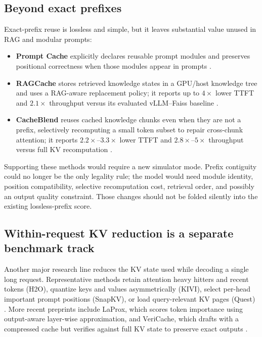 \documentclass[11pt]{article}
\begin{document}
\subsection{Beyond exact prefixes}

Exact-prefix reuse is lossless and simple, but it leaves substantial value unused in
RAG and modular prompts:

\begin{itemize}
  \item \textbf{Prompt Cache} explicitly declares reusable prompt modules and preserves
  positional correctness when those modules appear in prompts \cite{promptcache}.
  \item \textbf{RAGCache} stores retrieved knowledge states in a GPU/host knowledge tree
  and uses a RAG-aware replacement policy; it reports up to \(4\times\) lower TTFT and
  \(2.1\times\) throughput versus its evaluated vLLM--Faiss baseline
  \cite{ragcache}.
  \item \textbf{CacheBlend} reuses cached knowledge chunks even when they are not a
  prefix, selectively recomputing a small token subset to repair cross-chunk attention;
  it reports \(2.2\times\)--\(3.3\times\) lower TTFT and
  \(2.8\times\)--\(5\times\) throughput versus full KV recomputation
  \cite{cacheblend}.
\end{itemize}

Supporting these methods would require a new simulator mode.  Prefix contiguity could no
longer be the only legality rule; the model would need module identity, position
compatibility, selective recomputation cost, retrieval order, and possibly an output
quality constraint.  Those changes should not be folded silently into the existing
lossless-prefix score.

\subsection{Within-request KV reduction is a separate benchmark track}

Another major research line reduces the KV state used while decoding a single long
request.  Representative methods retain attention heavy hitters and recent tokens
(H2O), quantize keys and values asymmetrically (KIVI), select per-head important prompt
positions (SnapKV), or load query-relevant KV pages (Quest)
\cite{h2o,kivi,snapkv,quest}.  More recent preprints include LaProx, which scores token
importance using output-aware layer-wise approximation, and VeriCache, which drafts with
a compressed cache but verifies against full KV state to preserve exact outputs
\cite{laprox,vericache}.
\end{document}
